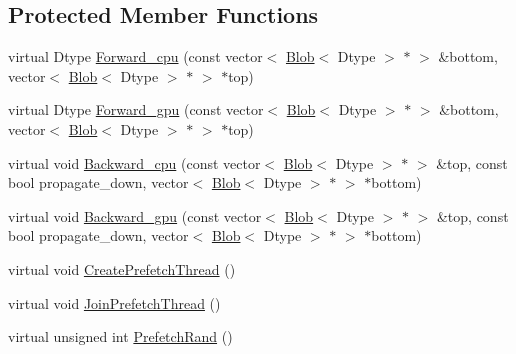 \subsection*{Protected Member Functions}
\begin{DoxyCompactItemize}
\item 
virtual Dtype \hyperlink{classcaffe_1_1_window_data_layer_a2a2d216fc883126708892da7f1496d33}{Forward\+\_\+cpu} (const vector$<$ \hyperlink{classcaffe_1_1_blob}{Blob}$<$ Dtype $>$ $\ast$ $>$ \&bottom, vector$<$ \hyperlink{classcaffe_1_1_blob}{Blob}$<$ Dtype $>$ $\ast$ $>$ $\ast$top)
\item 
virtual Dtype \hyperlink{classcaffe_1_1_window_data_layer_a920786219c1bad25f41c39212e2d6fab}{Forward\+\_\+gpu} (const vector$<$ \hyperlink{classcaffe_1_1_blob}{Blob}$<$ Dtype $>$ $\ast$ $>$ \&bottom, vector$<$ \hyperlink{classcaffe_1_1_blob}{Blob}$<$ Dtype $>$ $\ast$ $>$ $\ast$top)
\item 
virtual void \hyperlink{classcaffe_1_1_window_data_layer_a39778e64942e652e2f9d8b41af621251}{Backward\+\_\+cpu} (const vector$<$ \hyperlink{classcaffe_1_1_blob}{Blob}$<$ Dtype $>$ $\ast$ $>$ \&top, const bool propagate\+\_\+down, vector$<$ \hyperlink{classcaffe_1_1_blob}{Blob}$<$ Dtype $>$ $\ast$ $>$ $\ast$bottom)
\item 
virtual void \hyperlink{classcaffe_1_1_window_data_layer_ac008d7905f98366ae679a0fd6626abdb}{Backward\+\_\+gpu} (const vector$<$ \hyperlink{classcaffe_1_1_blob}{Blob}$<$ Dtype $>$ $\ast$ $>$ \&top, const bool propagate\+\_\+down, vector$<$ \hyperlink{classcaffe_1_1_blob}{Blob}$<$ Dtype $>$ $\ast$ $>$ $\ast$bottom)
\item 
virtual void \hyperlink{classcaffe_1_1_window_data_layer_a0257899761f24a9b4788098cfcfd8c19}{Create\+Prefetch\+Thread} ()
\item 
virtual void \hyperlink{classcaffe_1_1_window_data_layer_ae33d1bf83c5eab2f95cff3dd9db97719}{Join\+Prefetch\+Thread} ()
\item 
virtual unsigned int \hyperlink{classcaffe_1_1_window_data_layer_abaf3ab7f820a8836ebdc0faaa5997915}{Prefetch\+Rand} ()
\end{DoxyCompactItemize}
